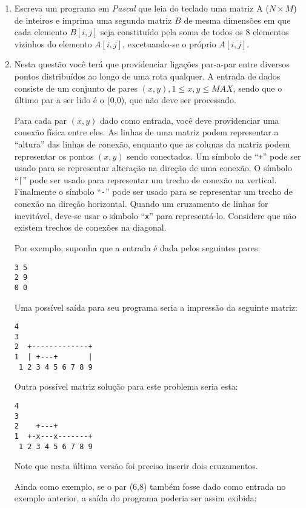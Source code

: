 \begin{enumerate}
\item Escreva um programa em \emph{Pascal} que leia do teclado uma matriz A 
($N \times M$)
de inteiros e imprima uma segunda matriz $B$ de mesma dimensões em que
cada elemento $B[i,j]$ seja constituído pela soma de todos os 8 elementos
vizinhos do elemento $A[i,j]$, excetuando-se o próprio $A[i,j]$.


\item Nesta questão você terá que providenciar ligações par-a-par 
entre diversos pontos distribuídos ao longo de uma rota qualquer.
A entrada de dados consiste de um conjunto de pares $(x,y), 1\leq x,y \leq
MAX$, sendo
que o último par a ser lido é o (0,0), que não deve ser processado.

Para cada par $(x,y)$ dado como entrada, você deve providenciar uma
conexão física entre eles. 
As linhas de uma matriz podem representar a ``altura'' das
linhas de conexão, enquanto que as colunas da matriz podem representar
os pontos $(x,y)$ sendo conectados. Um símbolo de ``\verb#+#'' pode ser 
usado para se representar alteração na direção de uma conexão. 
O símbolo ``\verb#|#'' pode ser usado para representar um trecho de 
conexão na vertical. Finalmente o símbolo ``\verb#-#'' pode ser usado
para se representar um trecho de conexão na direção horizontal.
Quando um cruzamento de linhas for inevitável, deve-se usar o
símbolo ``\verb#x#'' para representá-lo. Considere que não existem trechos 
de conexões na diagonal.

Por exemplo, suponha que a entrada é dada pelos seguintes pares:

\begin{verbatim}
3 5
2 9
0 0
\end{verbatim}

Uma possível saída para seu programa seria a impressão da seguinte
matriz:

\begin{verbatim}
4
3         
2  +-------------+
1  | +---+       |
 1 2 3 4 5 6 7 8 9
\end{verbatim}

Outra possível matriz solução para este problema seria esta:
\begin{verbatim}
4
3         
2    +---+  
1  +-x---x-------+
 1 2 3 4 5 6 7 8 9
\end{verbatim}

Note que nesta última versão foi preciso inserir dois cruzamentos.

Ainda como exemplo, se o par (6,8) também fosse dado como entrada no 
exemplo anterior, a saída do programa poderia ser assim exibida:


\end{enumerate}

